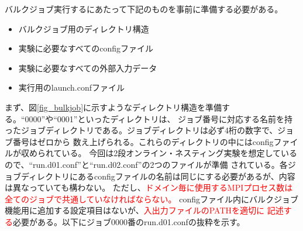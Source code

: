 バルクジョブ実行するにあたって下記のものを事前に準備する必要がある。
\begin{itemize}
\item バルクジョブ用のディレクトリ構造
\item 実験に必要なすべてのconfigファイル
\item 実験に必要なすべての外部入力データ
\item 実行用のlaunch.confファイル
\end{itemize}

まず、図\ref{fig_bulkjob}に示すようなディレクトリ構造を準備する。``0000''や``0001''といったディレクトリは、
ジョブ番号に対応する名前を持ったジョブディレクトリである。ジョブディレクトリは必ず4桁の数字で、ジョブ番号はゼロから
数え上げられる。これらのディレクトリの中にはconfigファイルが収められている。
今回は2段オンライン・ネスティング実験を想定しているので、``run.d01.conf''と``run.d02.conf''の2つのファイルが準備
されている。各ジョブディレクトリにあるconfigファイルの名前は同じにする必要があるが、内容は異なっていても構わない。
ただし、\textcolor{red}{ドメイン毎に使用するMPIプロセス数は全てのジョブで共通していなければならない。}
configファイル内にバルクジョブ機能用に追加する設定項目はないが、\textcolor{red}{入出力ファイルのPATHを適切に
記述する}必要がある。以下にジョブ0000番のrun.d01.confの抜粋を示す。\\

